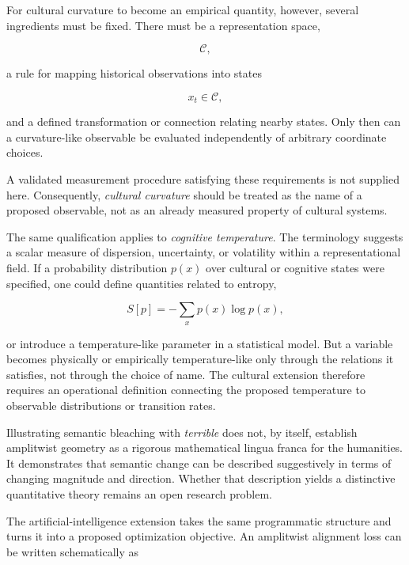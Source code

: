 \documentclass[11pt]{article}
\begin{document}
For cultural curvature to become an empirical quantity, however, several ingredients must be fixed. There must be a representation space,

\begin{equation}
\mathcal C,
\end{equation}

a rule for mapping historical observations into states

\begin{equation}
x_t\in\mathcal C,
\end{equation}

and a defined transformation or connection relating nearby states. Only then can a curvature-like observable be evaluated independently of arbitrary coordinate choices.

A validated measurement procedure satisfying these requirements is not supplied here. Consequently, \emph{cultural curvature} should be treated as the name of a proposed observable, not as an already measured property of cultural systems.

The same qualification applies to \emph{cognitive temperature}. The terminology suggests a scalar measure of dispersion, uncertainty, or volatility within a representational field. If a probability distribution $p(x)$ over cultural or cognitive states were specified, one could define quantities related to entropy,

\begin{equation}
S[p]
=
-\sum_x p(x)\log p(x),
\end{equation}

or introduce a temperature-like parameter in a statistical model. But a variable becomes physically or empirically temperature-like only through the relations it satisfies, not through the choice of name. The cultural extension therefore requires an operational definition connecting the proposed temperature to observable distributions or transition rates.

Illustrating semantic bleaching with \emph{terrible} does not, by itself, establish amplitwist geometry as a rigorous mathematical lingua franca for the humanities. It demonstrates that semantic change can be described suggestively in terms of changing magnitude and direction. Whether that description yields a distinctive quantitative theory remains an open research problem.

The artificial-intelligence extension takes the same programmatic structure and turns it into a proposed optimization objective. An amplitwist alignment loss can be written schematically as
\end{document}
